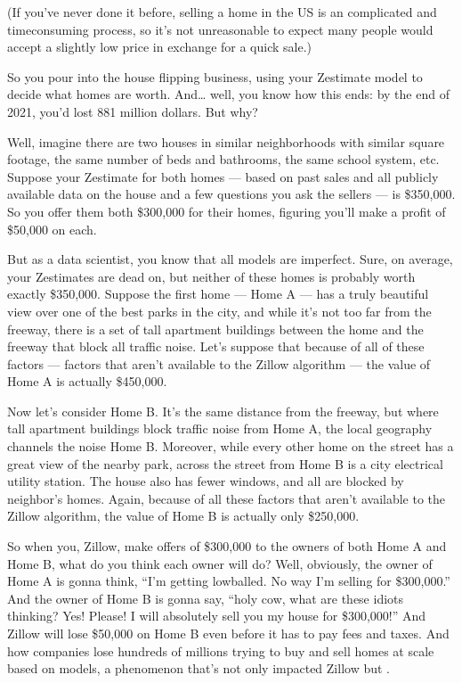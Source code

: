 \documentclass[letterpaper,10pt,english]{jupyterBook}
\begin{document}
\sphinxAtStartPar
(If you’ve never done it before, selling a home in the US is an  complicated and time\sphinxhyphen{}consuming process, so it’s not unreasonable to expect many people would accept a slightly low price in exchange for a quick sale.)

\sphinxAtStartPar
So you pour  into the house flipping business, using your Zestimate model to decide what homes are worth. And… well, you know how this ends: by the end of 2021, you’d lost 881 million dollars. But why?

\sphinxAtStartPar
Well, imagine there are two houses in similar neighborhoods with similar square footage, the same number of beds and bathrooms, the same school system, etc. Suppose your Zestimate for both homes — based on past sales and all publicly available data on the house and a few questions you ask the sellers — is \$350,000. So you offer them both \$300,000 for their homes, figuring you’ll make a profit of \$50,000 on each.

\sphinxAtStartPar
But as a data scientist, you know that all models are imperfect. Sure, on average, your Zestimates are dead on, but neither of these homes is probably worth exactly \$350,000. Suppose the first home — Home A — has a truly beautiful view over one of the best parks in the city, and while it’s not too far from the freeway, there is a set of tall apartment buildings between the home and the freeway that block all traffic noise. Let’s suppose that because of all of these factors — factors that aren’t available to the Zillow algorithm — the  value of Home A is actually \$450,000.

\sphinxAtStartPar
Now let’s consider Home B. It’s the same distance from the freeway, but where tall apartment buildings block traffic noise from Home A, the local geography channels the noise  Home B. Moreover, while every other home on the street has a great view of the nearby park,  across the street from Home B is a city electrical utility station. The house also has fewer windows, and all are blocked by neighbor’s homes. Again, because of all these factors that aren’t available to the Zillow algorithm, the  value of Home B is actually only \$250,000.

\sphinxAtStartPar
So when you, Zillow, make offers of \$300,000 to the owners of both Home A and Home B, what do you think each owner will do? Well, obviously, the owner of Home A is gonna think, “I’m getting low\sphinxhyphen{}balled. No way I’m selling for \$300,000.” And the owner of Home B is gonna say, “holy cow, what are these idiots thinking? Yes! Please! I will absolutely sell you my house for \$300,000!” And Zillow will lose  \$50,000 on Home B even before it has to pay fees and taxes. And  how companies lose hundreds of millions trying to buy and sell homes at scale based on models, a phenomenon that’s not only impacted Zillow but .
\end{document}
